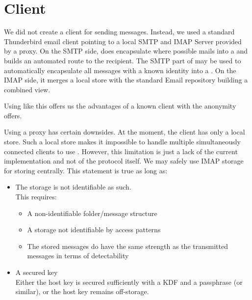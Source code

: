 \section{Client}
We did not create a \MessageVortex{} client for sending messages. Instead, we used a standard Thunderbird email client pointing to a local SMTP and IMAP Server provided by a \MessageVortex{} proxy. On the SMTP side, \MessageVortex{} does encapsulate where possible mails into a \VortexMessage{} and builds an automated route to the recipient. The SMTP part of \VortexMessage{} may be used to automatically encapsulate all messages with a known \MessageVortex{} identity into a \VortexMessage. On the IMAP side, it merges a local \VortexMessage{} store with the standard Email repository building a combined view.

Using \MessageVortex{} like this offers us the advantages of a known client with the anonymity \MessageVortex{} offers.

Using a proxy has certain downsides. At the moment, the \MessageVortex{} client has only a local store. Such a local store makes it impossible to handle multiple simultaneously connected clients to use \MessageVortex. However, this limitation is just a lack of the current implementation and not of the protocol itself. We may safely use IMAP storage for storing \VortexMessages{} centrally. This statement is true as long as:
\begin{itemize}
	\item The storage is not identifiable as such.\\
	This requires:
	\begin{itemize}
		\item A non-identifiable folder/message structure
		\item A storage not identifiable by access patterns
		\item The stored messages do have the same strength as the transmitted messages in terms of detectability
	\end{itemize}
	\item A secured key\\
	Either the host key is secured sufficiently with a KDF and a passphrase (or similar), or the host key remains off-storage.
\end{itemize}

